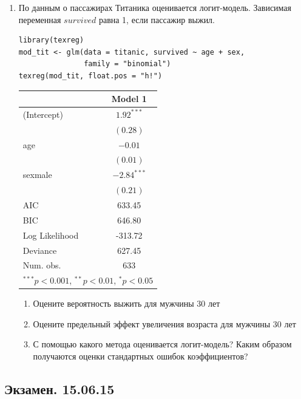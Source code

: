 \documentclass[12pt, a4paper]{article}
\begin{document}
\begin{enumerate}
\newpage
\item По данным о пассажирах Титаника оценивается логит-модель. Зависимая переменная $survived$ равна 1, если пассажир выжил.

\begin{verbatim}
library(texreg)
mod_tit <- glm(data = titanic, survived ~ age + sex,
               family = "binomial")
texreg(mod_tit, float.pos = "h!")
\end{verbatim}


\begin{tabular}{l c }
\hline
 & Model 1 \\
\hline
(Intercept)    & $1.92^{***}$  \\
               & $(0.28)$      \\
age            & $-0.01$       \\
               & $(0.01)$      \\
sexmale        & $-2.84^{***}$ \\
               & $(0.21)$      \\
\hline
AIC            & 633.45        \\
BIC            & 646.80        \\
Log Likelihood & -313.72       \\
Deviance       & 627.45        \\
Num. obs.      & 633           \\
\hline
\multicolumn{2}{l}{\scriptsize{$^{***}p<0.001$, $^{**}p<0.01$, $^*p<0.05$}}
\end{tabular}


\begin{enumerate}
\item Оцените вероятность выжить для мужчины 30 лет
\item Оцените предельный эффект увеличения возраста для мужчины 30 лет
\item С помощью какого метода оценивается логит-модель? Каким образом получаются оценки стандартных ошибок коэффициентов?
\end{enumerate}


\end{enumerate}


\subsection{Экзамен. 15.06.15}
\end{document}
